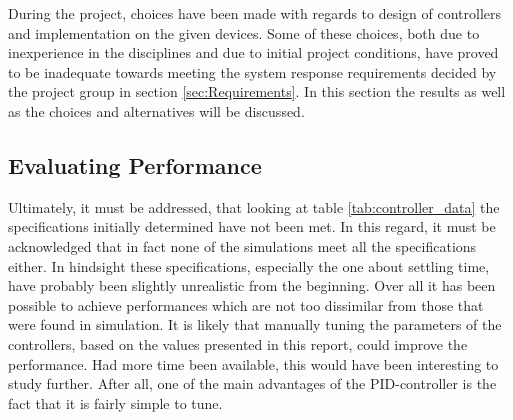 \documentclass[../../main.tex]{subfiles}
\begin{document}

During the project, choices have been made with regards to design of controllers and implementation on the given devices. Some of these choices, both due to inexperience in the disciplines and due to initial project conditions, have proved to be inadequate towards meeting the system response requirements decided by the project group in section \ref{sec:Requirements}. In this section the results as well as the choices and alternatives will be discussed.

\subsection{Evaluating Performance}

Ultimately, it must be addressed, that looking at table \ref{tab:controller_data} the specifications initially determined have not been met. In this regard, it must be acknowledged that in fact none of the simulations meet all the specifications either. In hindsight these specifications, especially the one about settling time, have probably been slightly unrealistic from the beginning. Over all it has been possible to achieve performances which are not too dissimilar from those that were found in simulation. It is likely that manually tuning the parameters of the controllers, based on the values presented in this report, could improve the performance. Had more time been available, this would have been interesting to study further. After all, one of the main advantages of the PID-controller is the fact that it is fairly simple to tune. 
\end{document}
